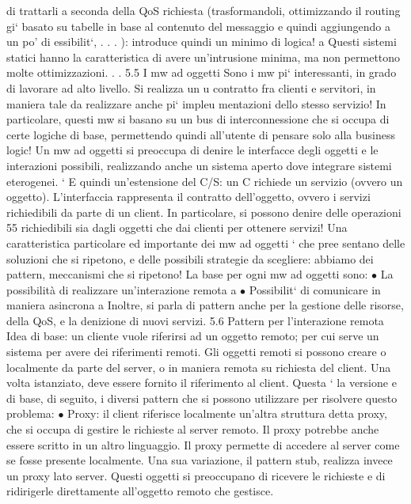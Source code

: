 \documentclass[a4paper,12pt]{article}
\begin{document}
di trattarli a seconda della QoS richiesta (trasformandoli, ottimizzando il routing gi` basato su tabelle in base al
contenuto del messaggio e quindi aggiungendo
a
un po' di essibilit`, . . . ): introduce quindi un minimo di logica!
a
Questi sistemi statici hanno la caratteristica di avere un'intrusione minima,
ma non permettono molte ottimizzazioni. . .
5.5
I mw ad oggetti
Sono i mw pi` interessanti, in grado di lavorare ad alto livello. Si realizza un
u
contratto fra clienti e servitori, in maniera tale da realizzare anche pi` impleu
mentazioni dello stesso servizio! In particolare, questi mw si basano su un bus
di interconnessione che si occupa di certe logiche di base, permettendo quindi
all'utente di pensare solo alla business logic! Un mw ad oggetti si preoccupa di
denire le interfacce degli oggetti e le interazioni possibili, realizzando anche un
sistema aperto dove integrare sistemi eterogenei.
`
E quindi un'estensione del C/S: un C richiede un servizio (ovvero un oggetto). L'interfaccia rappresenta il contratto
dell'oggetto, ovvero i servizi richiedibili da parte di un client. In particolare, si possono denire delle operazioni
55
richiedibili sia dagli oggetti che dai clienti per ottenere servizi!
Una caratteristica particolare ed importante dei mw ad oggetti ` che pree
sentano delle soluzioni che si ripetono, e delle possibili strategie da scegliere:
abbiamo dei pattern, meccanismi che si ripetono!
La base per ogni mw ad oggetti sono:
$\bullet$ La possibilità di realizzare un'interazione remota
a
$\bullet$ Possibilit` di comunicare in maniera asincrona
a
Inoltre, si parla di pattern anche per la gestione delle risorse, della QoS, e la
denizione di nuovi servizi.
5.6
Pattern per l'interazione remota
Idea di base: un cliente vuole riferirsi ad un oggetto remoto; per cui serve un
sistema per avere dei riferimenti remoti. Gli oggetti remoti si possono creare o
localmente da parte del server, o in maniera remota su richiesta del client. Una
volta istanziato, deve essere fornito il riferimento al client. Questa ` la versione
e
di base, di seguito, i diversi pattern che si possono utilizzare per risolvere questo
problema:
$\bullet$ Proxy: il client riferisce localmente un'altra struttura detta proxy, che si
occupa di gestire le richieste al server remoto. Il proxy potrebbe anche
essere scritto in un altro linguaggio. Il proxy permette di accedere al server
come se fosse presente localmente.
Una sua variazione, il pattern stub, realizza invece un proxy lato server.
Questi oggetti si preoccupano di ricevere le richieste e di ridirigerle direttamente all'oggetto remoto che gestisce.
\end{document}
